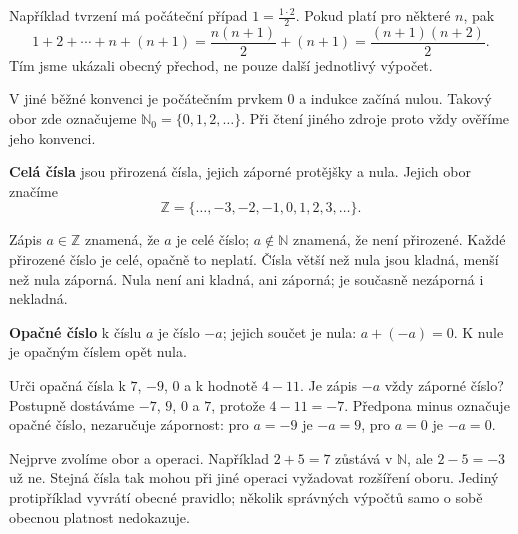 \documentclass[11pt,a4paper]{article}
\begin{document}
Například tvrzení  má počáteční
případ $1=\frac{1\cdot2}2$. Pokud platí pro některé $n$, pak
\[
1+2+\cdots+n+(n+1)
=\frac{n(n+1)}2+(n+1)=\frac{(n+1)(n+2)}2.
\]
Tím jsme ukázali obecný přechod, ne pouze další jednotlivý výpočet.

V jiné běžné konvenci je počátečním prvkem $0$ a indukce začíná nulou.
Takový obor zde označujeme $\mathbb N_0=\{0,1,2,\ldots\}$.
Při čtení jiného zdroje proto vždy ověříme jeho konvenci.


\begin{definiceBox}[title={Definice - Celá čísla}]
\textbf{Celá čísla} jsou přirozená čísla, jejich záporné protějšky a nula.
Jejich obor značíme
\[
\mathbb Z=\{\ldots,-3,-2,-1,0,1,2,3,\ldots\}.
\]
\end{definiceBox}

Zápis $a\in\mathbb Z$ znamená, že $a$ je celé číslo; $a\notin\mathbb N$
znamená, že není přirozené. Každé přirozené číslo je celé, opačně to neplatí.
Čísla větší než nula jsou kladná, menší než nula záporná. Nula není ani
kladná, ani záporná; je současně nezáporná i nekladná.

\begin{definiceBox}[title={Definice - Opačné číslo}]
\textbf{Opačné číslo} k číslu $a$ je číslo $-a$; jejich součet je nula:
$a+(-a)=0$. K nule je opačným číslem opět nula.
\end{definiceBox}

\begin{prikladReseniBox}[title={Příklad 1},breakable=false]
Urči opačná čísla k $7$, $-9$, $0$ a k hodnotě $4-11$.
Je zápis $-a$ vždy záporné číslo?
\tcblower
Postupně dostáváme $-7$, $9$, $0$ a $7$, protože $4-11=-7$.
Předpona minus označuje opačné číslo, nezaručuje zápornost:
pro $a=-9$ je $-a=9$, pro $a=0$ je $-a=0$.
\end{prikladReseniBox}

Nejprve zvolíme obor a operaci. Například $2+5=7$ zůstává v $\mathbb N$,
ale $2-5=-3$ už ne. Stejná čísla tak mohou při jiné operaci vyžadovat
rozšíření oboru. Jediný protipříklad vyvrátí obecné pravidlo;
několik správných výpočtů samo o sobě obecnou platnost nedokazuje.
\end{document}
